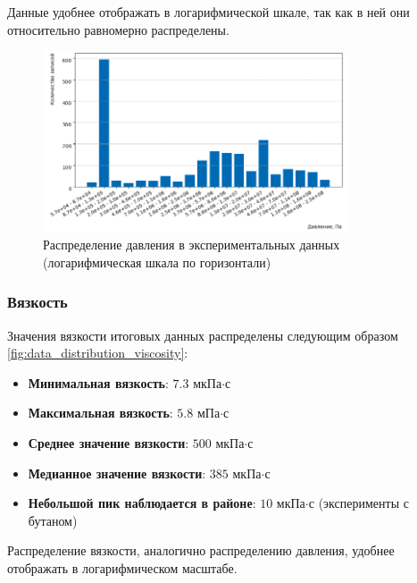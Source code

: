 \documentclass[a4paper,12pt]{article}
\begin{document}
      Данные удобнее отображать в логарифмической шкале, так как в ней они относительно равномерно распределены.
      \begin{figure}[ht!]
        \centering
        \includegraphics[width=0.8\textwidth]{data_distribution_pressure.png}
        \caption{Распределение давления в экспериментальных данных (логарифмическая шкала по горизонтали)}
        \label{fig:data_distribution_pressure}
      \end{figure}

    \subsubsection{Вязкость}
      Значения вязкости итоговых данных распределены следующим образом \autoref{fig:data_distribution_viscosity}:
      
      \begin{itemize}
          \item \textbf{Минимальная вязкость}: \(7.3\) мкПа\(\cdot\)с
          \item \textbf{Максимальная вязкость}: \(5.8\) мПа\(\cdot\)с
          \item \textbf{Среднее значение вязкости}: \(500\) мкПа\(\cdot\)с
          \item \textbf{Медианное значение вязкости}: \(385\) мкПа\(\cdot\)с
          \item \textbf{Небольшой пик наблюдается в районе}: \(10\) мкПа\(\cdot\)с (эксперименты с бутаном)
      \end{itemize}
      
      Распределение вязкости, аналогично распределению давления, удобнее отображать в логарифмическом масштабе.
      
\end{document}
